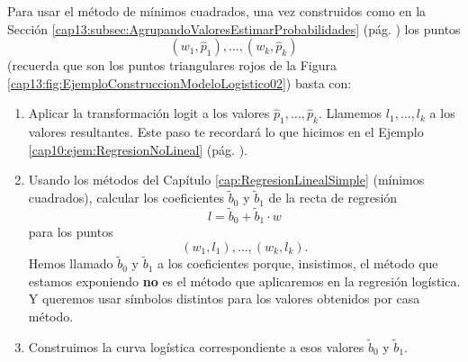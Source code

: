 Para usar el método de mínimos cuadrados, una vez construidos como en la Sección \ref{cap13:subsec:AgrupandoValoresEstimarProbabilidades} (pág. \pageref{cap13:subsec:AgrupandoValoresEstimarProbabilidades}) los puntos
\[(w_1,\hat p_1),\ldots,(w_k,\hat p_k)\]
(recuerda que son los puntos triangulares rojos de la Figura \ref{cap13:fig:EjemploConstruccionModeloLogistico02}) basta con:
\begin{enumerate}
  \item Aplicar la transformación logit a los valores $\hat p_1,\ldots,\hat p_k$. Llamemos $l_1,\ldots,l_k$ a los valores resultantes. Este paso te recordará lo que hicimos en el Ejemplo \ref{cap10:ejem:RegresionNoLineal} (pág. \pageref{cap10:ejem:RegresionNoLineal}).
  \item Usando los métodos del Capítulo \ref{cap:RegresionLinealSimple} (mínimos cuadrados), calcular los coeficientes $\widetilde b_0$ y $\widetilde b_1$ de la recta de regresión
      \[l = \widetilde b_0 +\widetilde b_1\cdot w\]
      para los puntos
      \[(w_1,l_1),\ldots,(w_k,l_k).\]
      Hemos llamado $\widetilde b_0$ y $\widetilde b_1$ a los coeficientes porque, insistimos, el método que estamos exponiendo {\bf no} es el método que aplicaremos en la regresión logística. Y queremos usar símbolos distintos para los valores obtenidos por casa método.
  \item Construimos la curva logística correspondiente a esos valores $\widetilde b_0$ y $\widetilde b_1$.
\end{enumerate}


